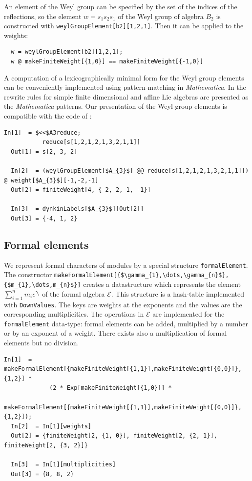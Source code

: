 \documentclass[preprint,12pt]{elsarticle}
\begin{document}
An element of the Weyl group can be specified by the set of the indices of the reflections, so the element  $w=s_{1}s_{2}s_{1}$ of the Weyl group of algebra $B_{2}$ is constructed with \lstinline{weylGroupElement[b2][1,2,1]}. Then it can be applied to the weights:
\begin{lstlisting}
  w = weylGroupElement[b2][1,2,1];
  w @ makeFiniteWeight[{1,0}] == makeFiniteWeight[{-1,0}]
\end{lstlisting}

A computation of a lexicographically minimal form \cite{casselman1994machine,casselman1995automata} for the Weyl group elements can be conveniently implemented using pattern-matching in {\it Mathematica}. In \cite{KallenShortlex} the rewrite rules for simple finite dimensional and affine Lie algebras are presented as the {\it Mathematica} patterns. Our presentation of the Weyl group elements is compatible with the code of \cite{KallenShortlex}:
\begin{lstlisting}[mathescape=true]
  In[1]  = $<<$A3reduce;
           reduce[s[1,2,1,2,1,3,2,1,1]]
  Out[1] = s[2, 3, 2]

  In[2]  = (weylGroupElement[$A_{3}$] @@ reduce[s[1,2,1,2,1,3,2,1,1]]) @ weight[$A_{3}$][-1,-2,-1]
  Out[2] = finiteWeight[4, {-2, 2, 1, -1}]

  In[3]  = dynkinLabels[$A_{3}$][Out[2]]
  Out[3] = {-4, 1, 2}
\end{lstlisting}

\subsection{Formal elements}
\label{sec:formal-elements}

We represent formal characters of modules by a special structure \lstinline{formalElement}.  The constructor \lstinline[mathescape=true]!makeFormalElement[{$\gamma_{1},\dots,\gamma_{n}$},{$m_{1},\dots,m_{n}$}]! creates a datastructure which represents the element $\sum_{i=1}^{n} m_{i} e^{\gamma_{i}}$ of the formal algebra $\mathcal{E}$. This structure is a hash-table implemented with \lstinline{DownValues}. The keys are weights at the exponents and the values are the  corresponding multiplicities. The operations in $\mathcal{E}$ are implemented for the \lstinline{formalElement} data-type: formal elements can be added, multiplied by a number or by an exponent of a weight. There exists also a multiplication of formal elements but no division.
\begin{lstlisting}[mathescape=true]
  In[1]  = makeFormalElement[{makeFiniteWeight[{1,1}],makeFiniteWeight[{0,0}]},{1,2}] *
             (2 * Exp[makeFiniteWeight[{1,0}]] *
             makeFormalElement[{makeFiniteWeight[{1,1}],makeFiniteWeight[{0,0}]},{1,2}]);
  In[2]  = In[1][weights]
  Out[2] = {finiteWeight[2, {1, 0}], finiteWeight[2, {2, 1}], finiteWeight[2, {3, 2}]}

  In[3]  = In[1][multiplicities]
  Out[3] = {8, 8, 2}
\end{lstlisting}
\end{document}
